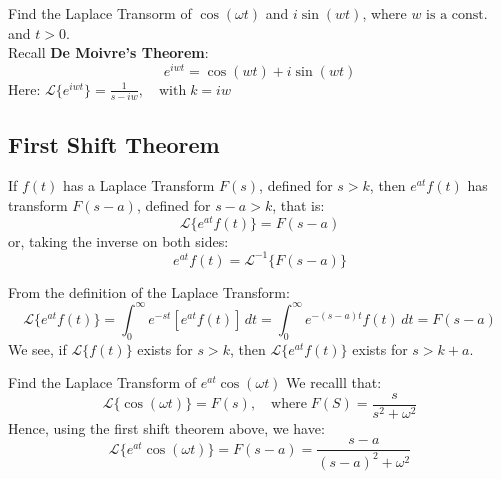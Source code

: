 \documentclass[a4paper]{extarticle}
\theoremstyle{definition}
\theoremstyle{plain}
\begin{document}
\begin{examplebox}[Example]
  Find the Laplace Transorm of $\cos(\omega t)$ and $i\sin(wt)$, where $w  \text{ is a const.}$ and  $t > 0$. \\
  Recall \textbf{De Moivre's Theorem}:
  $$e^{iwt} = \cos(wt) + i\sin(wt)$$
  Here: $\mathcal{L}\{e^{iwt}\} = \frac{1}{s-iw}, \quad \text{with} \; k = iw$
\end{examplebox}

\newpage
\subsection{First Shift Theorem}
\begin{theorembox}
  If $f(t)$ has a Laplace Transform $F(s)$, defined for $s > k$, then $e^{at}f(t)$ has transform $F(s-a)$, defined for $s-a > k$, that is:
  $$\mathcal{L}\{e^{at}f(t)\} = F(s-a)$$
  or, taking the inverse on both sides:
  $$e^{at}f(t) = \mathcal{L}^{-1}\{F(s-a)\}$$
\end{theorembox}
\begin{proofbox}
  From the definition of the Laplace Transform:
  $$\mathcal{L}\{e^{at}f(t)\} = \int_0^\infty e^{-st}[e^{at}f(t)] \, dt =  \int_0^\infty e^{-(s-a)t} f(t) \, dt = F(s-a)$$
  We see, if $\mathcal{L}\{f(t)\}$ exists for $s > k$, then $\mathcal{L}\{e^{at}f(t)\}$ exists for $s > k + a$.
\end{proofbox}

\begin{examplebox}[Example]
  Find the Laplace Transform of $e^{at} \cos(\omega t)$
  We recalll that:
  $$\mathcal{L}\{\cos(\omega t)\} = F(s), \quad \text{where} \; F(S) = \dfrac{s}{s^2 + \omega ^2}$$
  Hence, using the first shift theorem above, we have:
  $$\mathcal{L}\{e^{at} \cos(\omega t)\} = F(s-a) = \dfrac{s-a}{(s-a)^2 + \omega^2}$$
\end{examplebox}
\end{document}
